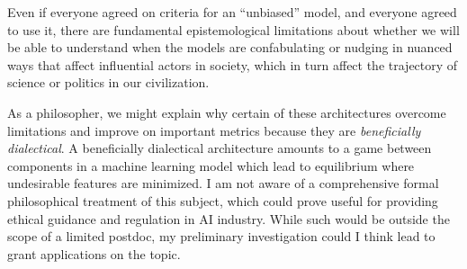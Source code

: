 \documentclass[11pt, oneside]{article}   	%
\begin{document}
Even if everyone agreed on criteria for an ``unbiased'' model, and everyone agreed to use it, there are fundamental epistemological limitations about whether we will be able to understand when the models are confabulating or nudging in nuanced ways that affect influential actors in society, which in turn affect the trajectory of science or politics in our civilization.




As a philosopher, we might explain why certain of these architectures overcome limitations and improve on important metrics because they are \emph{beneficially dialectical}.  A beneficially dialectical architecture amounts to a game between components in a machine learning model which lead to equilibrium where undesirable features are minimized.  I am not aware of a comprehensive formal philosophical treatment of this subject, which could prove useful for providing ethical guidance and regulation in AI industry.  While such would be outside the scope of a limited postdoc, my preliminary investigation could I think lead to grant applications on the topic.






\end{document}
